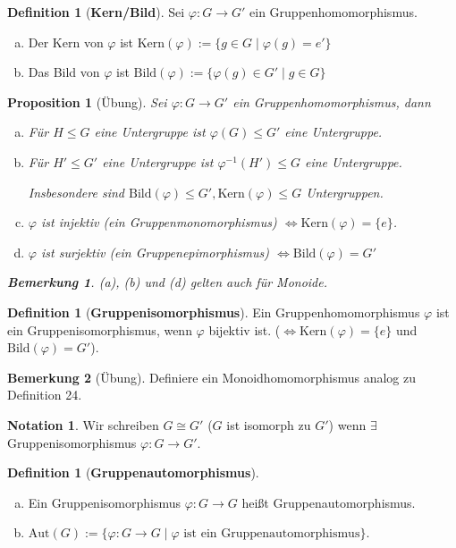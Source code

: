 \documentclass[a4paper]{report}
\theoremstyle{plain}
\newtheorem{prop}[thm]{Proposition}
\theoremstyle{definition}
\newtheorem{defi}[thm]{Definition}
\newtheorem*{bem*}{Bemerkung}
\newtheorem*{nota*}{Notation}
\begin{document}
\begin{defi}[\textbf{Kern/Bild}]
  Sei $\varphi : G \to G'$ ein Gruppenhomomorphismus.
  \begin{enumerate}[(a)]
    \item Der Kern von $\varphi$ ist $\mathrm{Kern}(\varphi) := \{g \in G \mid \varphi(g) = e'\}$
    \item Das Bild von $\varphi$ ist $\mathrm{Bild}(\varphi) := \{\varphi(g) \in G'\mid g \in G\}$
  \end{enumerate}
\end{defi}

\begin{prop}[Übung]
  Sei $\varphi : G \to G'$ ein Gruppenhomomorphismus, dann
  \begin{enumerate}[(a)]
          \item Für $H \le G$ eine Untergruppe ist $\varphi(G) \le G'$ eine Untergruppe.
    \item Für $H' \le G'$ eine Untergruppe ist $\varphi^{-1}(H') \le G$ eine Untergruppe.

          Insbesondere sind $\mathrm{Bild}(\varphi) \le G', \mathrm{Kern}(\varphi) \le G$ Untergruppen.
    \item $\varphi$ ist injektiv (ein Gruppenmonomorphismus) $\iff \mathrm{Kern}(\varphi) = \{e\}$.
    \item $\varphi$ ist surjektiv (ein Gruppenepimorphismus) $\iff \mathrm{Bild}(\varphi) = G'$
  \end{enumerate}
  \begin{bem*}
(a), (b) und (d) gelten auch für Monoide.
  \end{bem*}
\end{prop}

\begin{defi}[\textbf{Gruppenisomorphismus}]
Ein Gruppenhomomorphismus $\varphi$ ist ein Gruppenisomorphismus, wenn $\varphi$ bijektiv ist. ($\iff \mathrm{Kern}(\varphi) = \{e\}$ und $\mathrm{Bild}(\varphi) =G'$).
\end{defi}
\begin{bem*}[Übung]
  Definiere ein Monoidhomomorphismus analog zu Definition 24.
\end{bem*}

\begin{nota*}
  Wir schreiben $G \cong G'$ ($G$ ist isomorph zu $G'$) wenn $\exists$ Gruppenisomorphismus $\varphi : G \to G'$.
\end{nota*}

\begin{defi}[\textbf{Gruppenautomorphismus}]
\begin{enumerate}[(a)]
  \item Ein Gruppenisomorphismus $\varphi : G \to G$ heißt Gruppenautomorphismus.
  \item $\mathrm{Aut}(G):= \{\varphi : G \to G \mid \varphi \text{ ist ein Gruppenautomorphismus}\}$.
\end{enumerate}
\end{defi}
\end{document}
